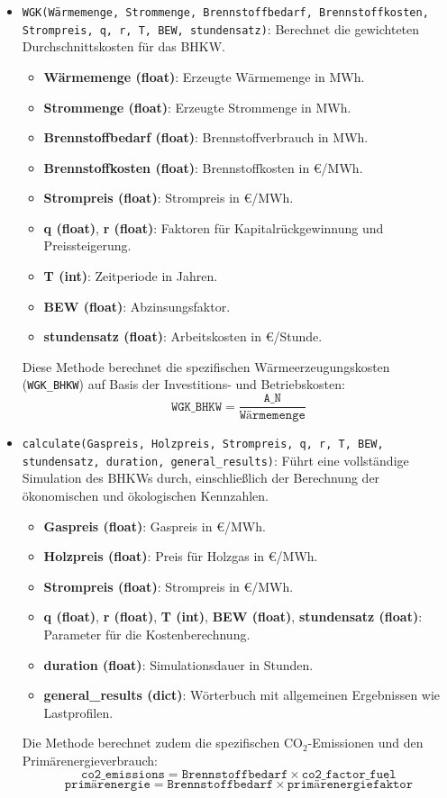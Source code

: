 \begin{itemize}
    \item \texttt{WGK(Wärmemenge, Strommenge, Brennstoffbedarf, Brennstoffkosten, Strompreis, q, r, T, BEW, stundensatz)}: Berechnet die gewichteten Durchschnittskosten für das BHKW.
    \begin{itemize}
        \item \textbf{Wärmemenge (float)}: Erzeugte Wärmemenge in MWh.
        \item \textbf{Strommenge (float)}: Erzeugte Strommenge in MWh.
        \item \textbf{Brennstoffbedarf (float)}: Brennstoffverbrauch in MWh.
        \item \textbf{Brennstoffkosten (float)}: Brennstoffkosten in €/MWh.
        \item \textbf{Strompreis (float)}: Strompreis in €/MWh.
        \item \textbf{q (float)}, \textbf{r (float)}: Faktoren für Kapitalrückgewinnung und Preissteigerung.
        \item \textbf{T (int)}: Zeitperiode in Jahren.
        \item \textbf{BEW (float)}: Abzinsungsfaktor.
        \item \textbf{stundensatz (float)}: Arbeitskosten in €/Stunde.
    \end{itemize}
    Diese Methode berechnet die spezifischen Wärmeerzeugungskosten (\texttt{WGK\_BHKW}) auf Basis der Investitions- und Betriebskosten:
    \[
    \texttt{WGK\_BHKW} = \frac{\texttt{A\_N}}{\texttt{Wärmemenge}}
    \]

    \item \texttt{calculate(Gaspreis, Holzpreis, Strompreis, q, r, T, BEW, stundensatz, duration, general\_results)}: Führt eine vollständige Simulation des BHKWs durch, einschließlich der Berechnung der ökonomischen und ökologischen Kennzahlen.
    \begin{itemize}
        \item \textbf{Gaspreis (float)}: Gaspreis in €/MWh.
        \item \textbf{Holzpreis (float)}: Preis für Holzgas in €/MWh.
        \item \textbf{Strompreis (float)}: Strompreis in €/MWh.
        \item \textbf{q (float)}, \textbf{r (float)}, \textbf{T (int)}, \textbf{BEW (float)}, \textbf{stundensatz (float)}: Parameter für die Kostenberechnung.
        \item \textbf{duration (float)}: Simulationsdauer in Stunden.
        \item \textbf{general\_results (dict)}: Wörterbuch mit allgemeinen Ergebnissen wie Lastprofilen.
    \end{itemize}
    Die Methode berechnet zudem die spezifischen CO$_2$-Emissionen und den Primärenergieverbrauch:
    \[
    \texttt{co2\_emissions} = \texttt{Brennstoffbedarf} \times \texttt{co2\_factor\_fuel}
    \]
    \[
    \texttt{primärenergie} = \texttt{Brennstoffbedarf} \times \texttt{primärenergiefaktor}
    \]
\end{itemize}

